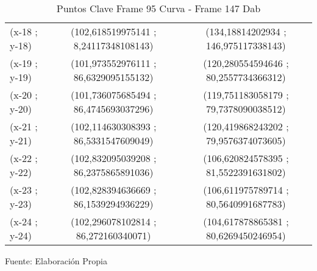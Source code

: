 \begin{table}[htbp]
\begin{tabular}{|l|c|c|}
		(x-18 ; y-18) & (102,618519975141 ; 8,24117348108143) & (134,18814202934 ; 146,975117338143) \\
		(x-19 ; y-19) & (101,973552976111 ; 86,6329095155132) & (120,280554594646 ; 80,2557734366312) \\
		(x-20 ; y-20) & (101,736075685494 ; 86,4745693037296) & (119,751183058179 ; 79,7378090038512) \\
		(x-21 ; y-21) & (102,114630308393 ; 86,5331547609049) & (120,419868243202 ; 79,9576374073605) \\
		(x-22 ; y-22) & (102,832095039208 ; 86,2375865891036) & (106,620824578395 ; 81,5522391631802) \\
		(x-23 ; y-23) & (102,828394636669 ; 86,1539294936229) & (106,611975789714 ; 80,5640991687783) \\
		(x-24 ; y-24) & (102,296078102814 ; 86,272160340071) & (104,617878865381 ; 80,6269450246954) \\ \hline
	\end{tabular}%
	\caption{Puntos Clave Frame 95 Curva - Frame 147 Dab }
	\footnotesize Fuente: Elaboración Propia
	\label{checkerporcentage2}
\end{table}%

\clearpage
\restoregeometry
{}
\text{  }
\linebreak[4] \null
\linebreak[4] \null
\linebreak[4] \null
\linebreak[4] \null 

